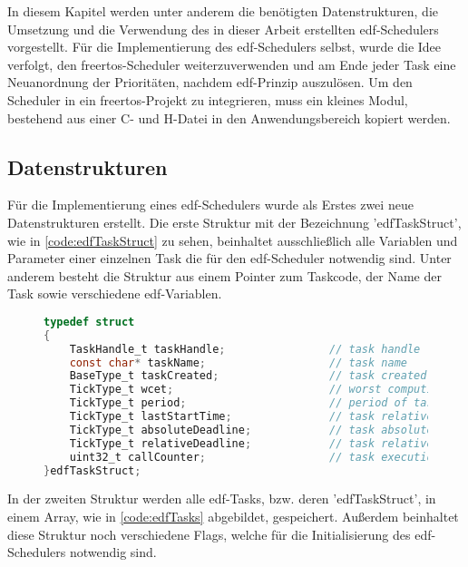 \documentclass[../EDF Master Thesis.tex]{subfiles}
\begin{document}
In diesem Kapitel werden unter anderem die benötigten Datenstrukturen, die Umsetzung und die Verwendung des in dieser Arbeit erstellten \ac{edf}-Schedulers vorgestellt.
Für die Implementierung des \ac{edf}-Schedulers selbst, wurde die Idee verfolgt, den \ac{freertos}-Scheduler weiterzuverwenden und am Ende jeder Task eine Neuanordnung der Prioritäten, nachdem \ac{edf}-Prinzip auszulösen.
Um den Scheduler in ein \ac{freertos}-Projekt zu integrieren, muss ein kleines Modul, bestehend aus einer C- und H-Datei in den Anwendungsbereich kopiert werden.

\subsection{Datenstrukturen} \label{section:datenstruktur}
Für die Implementierung eines \ac{edf}-Schedulers wurde als Erstes zwei neue Datenstrukturen erstellt.
Die erste Struktur mit der Bezeichnung 'edfTaskStruct', wie in \autoref{code:edfTaskStruct} zu sehen, beinhaltet ausschließlich alle Variablen und Parameter einer einzelnen Task die für den \ac{edf}-Scheduler notwendig sind.
Unter anderem besteht die Struktur aus einem Pointer zum Taskcode, der Name der Task sowie verschiedene \ac{edf}-Variablen.

\begin{figure}[H]
\begin{lstlisting}[language=C, caption=edfTaskStruct Struktur, label=code:edfTaskStruct]
typedef struct
{
    TaskHandle_t taskHandle;                // task handle
    const char* taskName;                   // task name
    BaseType_t taskCreated;                 // task created flag
    TickType_t wcet;                        // worst compution execution time
    TickType_t period;                      // period of task
    TickType_t lastStartTime;               // task relative deadline
    TickType_t absoluteDeadline;            // task absolute deadline
    TickType_t relativeDeadline;            // task relative deadline
    uint32_t callCounter;                   // task execution counter
}edfTaskStruct;
\end{lstlisting}
\end{figure}

\clearpage

In der zweiten Struktur werden alle \ac{edf}-Tasks, bzw. deren 'edfTaskStruct', in einem Array, wie in \autoref{code:edfTasks} abgebildet, gespeichert.
Außerdem beinhaltet diese Struktur noch verschiedene Flags, welche für die Initialisierung des \ac{edf}-Schedulers notwendig sind.
\end{document}
